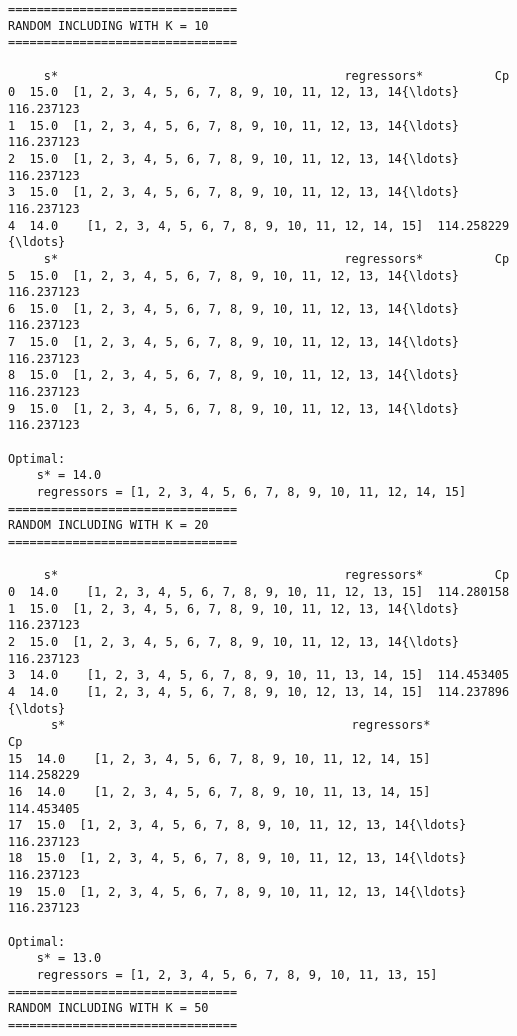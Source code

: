 \documentclass[11pt]{article}
\begin{document}
    \begin{Verbatim}[commandchars=\\\{\}]
================================
RANDOM INCLUDING WITH K = 10
================================

     s*                                        regressors*          Cp
0  15.0  [1, 2, 3, 4, 5, 6, 7, 8, 9, 10, 11, 12, 13, 14{\ldots}  116.237123
1  15.0  [1, 2, 3, 4, 5, 6, 7, 8, 9, 10, 11, 12, 13, 14{\ldots}  116.237123
2  15.0  [1, 2, 3, 4, 5, 6, 7, 8, 9, 10, 11, 12, 13, 14{\ldots}  116.237123
3  15.0  [1, 2, 3, 4, 5, 6, 7, 8, 9, 10, 11, 12, 13, 14{\ldots}  116.237123
4  14.0    [1, 2, 3, 4, 5, 6, 7, 8, 9, 10, 11, 12, 14, 15]  114.258229
{\ldots}
     s*                                        regressors*          Cp
5  15.0  [1, 2, 3, 4, 5, 6, 7, 8, 9, 10, 11, 12, 13, 14{\ldots}  116.237123
6  15.0  [1, 2, 3, 4, 5, 6, 7, 8, 9, 10, 11, 12, 13, 14{\ldots}  116.237123
7  15.0  [1, 2, 3, 4, 5, 6, 7, 8, 9, 10, 11, 12, 13, 14{\ldots}  116.237123
8  15.0  [1, 2, 3, 4, 5, 6, 7, 8, 9, 10, 11, 12, 13, 14{\ldots}  116.237123
9  15.0  [1, 2, 3, 4, 5, 6, 7, 8, 9, 10, 11, 12, 13, 14{\ldots}  116.237123

Optimal:
	s* = 14.0
	regressors = [1, 2, 3, 4, 5, 6, 7, 8, 9, 10, 11, 12, 14, 15]
================================
RANDOM INCLUDING WITH K = 20
================================

     s*                                        regressors*          Cp
0  14.0    [1, 2, 3, 4, 5, 6, 7, 8, 9, 10, 11, 12, 13, 15]  114.280158
1  15.0  [1, 2, 3, 4, 5, 6, 7, 8, 9, 10, 11, 12, 13, 14{\ldots}  116.237123
2  15.0  [1, 2, 3, 4, 5, 6, 7, 8, 9, 10, 11, 12, 13, 14{\ldots}  116.237123
3  14.0    [1, 2, 3, 4, 5, 6, 7, 8, 9, 10, 11, 13, 14, 15]  114.453405
4  14.0    [1, 2, 3, 4, 5, 6, 7, 8, 9, 10, 12, 13, 14, 15]  114.237896
{\ldots}
      s*                                        regressors*          Cp
15  14.0    [1, 2, 3, 4, 5, 6, 7, 8, 9, 10, 11, 12, 14, 15]  114.258229
16  14.0    [1, 2, 3, 4, 5, 6, 7, 8, 9, 10, 11, 13, 14, 15]  114.453405
17  15.0  [1, 2, 3, 4, 5, 6, 7, 8, 9, 10, 11, 12, 13, 14{\ldots}  116.237123
18  15.0  [1, 2, 3, 4, 5, 6, 7, 8, 9, 10, 11, 12, 13, 14{\ldots}  116.237123
19  15.0  [1, 2, 3, 4, 5, 6, 7, 8, 9, 10, 11, 12, 13, 14{\ldots}  116.237123

Optimal:
	s* = 13.0
	regressors = [1, 2, 3, 4, 5, 6, 7, 8, 9, 10, 11, 13, 15]
================================
RANDOM INCLUDING WITH K = 50
================================


\end{Verbatim}
\end{document}
